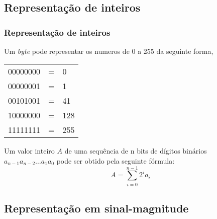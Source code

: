

\section{\insertlecture}

\subsection{Representação de inteiros}

\begin{frame}
  \frametitle{Representação de inteiros}

Um {\em byte} pode representar os numeros de 0 a 255 da seguinte forma,\\
\begin{center}
    \begin{tabular}{lll}
      00000000 & = & 0 \\
      00000001 & = & 1 \\
      00101001 & = & 41 \\
      10000000 & = & 128 \\
      11111111 & = & 255 \\
    \end{tabular}
  \end{center}
  
\pause
 Um valor inteiro $A$ de uma sequência de n bits de dígitos binários
 $a_{n-1}a_{n-2}\ldots a_1a_0$ pode ser obtido pela seguinte fórmula:
 \begin{equation}
   \label{eq:magnitudesinal}
   A = \sum_{i=0}^{n-1}2^ia_i
 \end{equation}

\end{frame}

\def\thetitle{Representação em sinal-magnitude}

\subsection{\thetitle}

